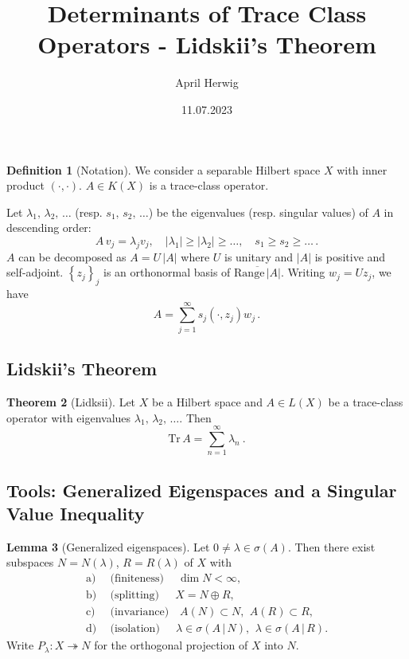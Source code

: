 \documentclass[a4paper, 10pt]{article}
\title{\vspace*{-5ex}Determinants of Trace Class Operators - Lidskii's Theorem}
\author{\vspace*{-15ex}April Herwig}
\date{11.07.2023}
\newcommand{\Tr}{\textrm{Tr}\,}
\newcommand{\ran}{\textrm{Range}\,}
\theoremstyle{definition}
\newtheorem{definition}{Definition}[section]
\newtheorem{theorem}[definition]{Theorem}
\newtheorem{lemma}[definition]{Lemma}
\theoremstyle{remark}
\theoremstyle{remark}
\begin{document}
\maketitle

\begin{definition}[Notation]
    We consider a separable Hilbert space $X$ with inner product $(\cdot, \cdot)$. $A \in K(X)$ is a trace-class operator. 

    Let $\lambda_1,\, \lambda_2,\, \ldots$ (resp. $s_1,\, s_2,\, \ldots$) be the eigenvalues (resp. singular values) of $A$ in descending order:
    \begin{equation}
        A\, v_j = \lambda_j v_j, \quad |\lambda_1| \geq |\lambda_2| \geq \ldots, \quad s_1 \geq s_2 \geq \ldots\, .
    \end{equation}
    $A$ can be decomposed as $A = U\, |A|$ where $U$ is unitary and $|A|$ is positive and self-adjoint. $\left\{ z_j \right\}_j$ is an orthonormal basis of $\overline{\ran |A|}$. Writing $w_j = U z_j$, we have
    \begin{equation}
        A = \sum_{j=1}^\infty s_j (\cdot, z_j) w_j \,. 
    \end{equation}
\end{definition}

\subsection{Lidskii's Theorem}

\begin{theorem}[Lidksii]
    \label{lidskii}
    Let $X$ be a Hilbert space and $A \in L(X)$ be a trace-class operator with eigenvalues $\lambda_1,\, \lambda_2,\, \ldots$. Then 
    \begin{equation}
        \Tr A = \sum_{n=1}^{\infty} \lambda_n\ . 
    \end{equation}
\end{theorem}

\subsection{Tools: Generalized Eigenspaces and a Singular Value Inequality}

\begin{lemma}[Generalized eigenspaces]
    Let $0 \neq \lambda \in \sigma (A)$. Then there exist subspaces $N = N(\lambda)$, $R = R(\lambda)$ of $X$ with
    \begin{align}
        \text{a)}\ &\ \text{(finiteness)} \quad\ \dim N < \infty, \\
        \text{b)}\ &\ \text{(splitting)} \quad\ \ X = N \oplus R, \\
        \text{c)}\ &\ \text{(invariance)} \quad A(N) \subset N,\,\ A(R) \subset R, \\
        \text{d)}\ &\ \text{(isolation)} \quad\ \ \lambda \in \sigma (A \,\vert\, N),\,\ \lambda \in \sigma (A \,\vert\, R). 
    \end{align}
    Write $P_\lambda : X \twoheadrightarrow N$ for the orthogonal projection of $X$ into $N$. 
\end{lemma}
\end{document}
